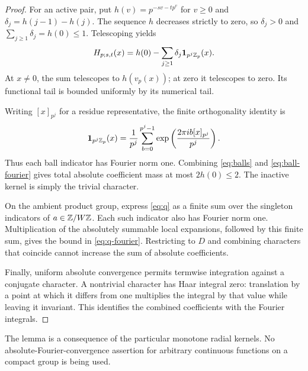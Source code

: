 \begin{proof}
For an active pair, put \(h(v)=p^{-sv-tp^v}\) for \(v\geq0\) and
\(\delta_j=h(j-1)-h(j)\). The sequence \(h\) decreases strictly to zero,
so \(\delta_j>0\) and \(\sum_{j\geq1}\delta_j=h(0)\leq1\).
Telescoping yields
\begin{equation}\label{eq:balls}
H_{p;s,t}(x)
=h(0)-\sum_{j\geq1}\delta_j\mathbf 1_{p^j\mathbb Z_p}(x).
\end{equation}
At \(x\ne0\), the sum telescopes to \(h(v_p(x))\); at zero it
telescopes to zero. Its functional tail is bounded uniformly by its
numerical tail.

Writing \([x]_{p^j}\) for a residue representative, the finite
orthogonality identity is
\begin{equation}\label{eq:ball-fourier}
\mathbf 1_{p^j\mathbb Z_p}(x)
=\frac1{p^j}\sum_{b=0}^{p^j-1}
\exp\left(\frac{2\pi i b[x]_{p^j}}{p^j}\right).
\end{equation}
Thus each ball indicator has Fourier norm one.
Combining \eqref{eq:balls} and \eqref{eq:ball-fourier} gives total
absolute coefficient mass at most \(2h(0)\leq2\).
The inactive kernel is simply the trivial character.

On the ambient product group, express \eqref{eq:q} as a finite sum
over the singleton indicators of \(a\in\mathbb Z/W\mathbb Z\). Each such indicator
also has Fourier norm one. Multiplication of the absolutely summable
local expansions, followed by this finite sum, gives the bound in
\eqref{eq:q-fourier}. Restricting to \(D\) and combining characters that
coincide cannot increase the sum of absolute coefficients.

Finally, uniform absolute convergence permits termwise integration
against a conjugate character. A nontrivial character has Haar
integral zero: translation by a point at which it differs from one
multiplies the integral by that value while leaving it invariant.
This identifies the combined coefficients with the Fourier integrals.
\end{proof}

The lemma is a consequence of the particular monotone radial kernels.
No absolute-Fourier-convergence assertion for arbitrary continuous
functions on a compact group is being used.
